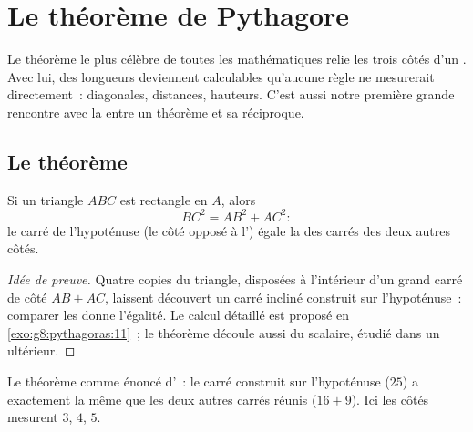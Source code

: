 \chapter{Le théorème de Pythagore}\label{ch:g8:pythagoras}

Le théorème le plus célèbre de toutes les mathématiques relie les
trois côtés d'un . Avec lui, des longueurs deviennent
calculables qu'aucune règle ne mesurerait directement~: diagonales,
distances, hauteurs. C'est aussi notre première grande rencontre avec
la  entre un théorème et sa réciproque.

\section{Le théorème}

\begin{theorem}[Pythagore]\label{thm:g8:pythagoras:direct}
Si un triangle $ABC$ est rectangle en $A$, alors
\[
BC^2 = AB^2 + AC^2 :
\]
le carré de l'hypoténuse (le côté opposé à l') égale la
 des carrés des deux autres côtés.
\end{theorem}

\begin{proof}[Idée de preuve]
Quatre copies du triangle, disposées à l'intérieur d'un grand carré
de côté $AB + AC$, laissent découvert un carré incliné construit sur
l'hypoténuse~: comparer les  donne l'égalité. Le calcul détaillé
est proposé en \cref{exo:g8:pythagoras:11}~; le théorème découle
aussi du  scalaire, étudié dans un  ultérieur.
\end{proof}

\begin{omfigure}

{\small Le théorème comme énoncé d'~: le carré construit sur
l'hypoténuse ($25$) a exactement la même  que les deux autres
carrés réunis ($16 + 9$). Ici les côtés mesurent $3$, $4$, $5$.}
\end{omfigure}

